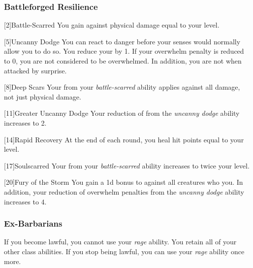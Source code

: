         \subsubsection{Battleforged Resilience}
            [2]{Battle-Scarred} You gain  against physical damage equal to your level.

            [5]{Uncanny Dodge} You can react to danger before your senses would normally allow you to do so.
            You reduce your  by 1.
            If your overwhelm penalty is reduced to 0, you are not considered to be overwhelmed.
            In addition, you are not \unaware when attacked by surprise.

            [8]{Deep Scars} Your  from your \textit{battle-scarred} ability applies against all damage, not just physical damage.

            [11]{Greater Uncanny Dodge}
            Your reduction of  from the \textit{uncanny dodge} ability increases to 2.

            [14]{Rapid Recovery}
            At the end of each round, you heal hit points equal to your level.

            [17]{Soulscarred}
            Your  from your \textit{battle-scarred} ability increases to twice your level.

            [20]{Fury of the Storm}
            You gain a \plus1d bonus to  against all creatures who  you.
            In addition, your reduction of overwhelm penalties from the \textit{uncanny dodge} ability increases to 4.

        \subsubsection{Ex-Barbarians}
            If you become lawful, you cannot use your \textit{rage} ability.
            You retain all of your other class abilities.
            If you stop being lawful, you can use your \textit{rage} ability once more.

